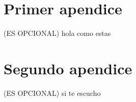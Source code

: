 
\appendix
\chapter{Primer apendice}
(ES OPCIONAL) 
hola como estas
\chapter{Segundo apendice}
(ES OPCIONAL)
si te escucho


\vskip 0.5cm



